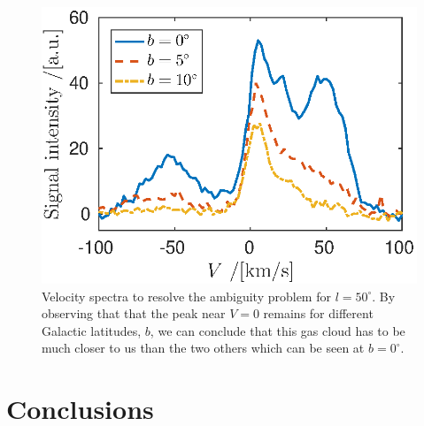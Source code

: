 \documentclass[11pt,a4paper, twocolumn,
swedish, english %
]{article}
\begin{document}
\begin{figure}\centering
\includegraphics[width=1\linewidth]{ambiguity.eps}
\caption{Velocity spectra to resolve the ambiguity problem for
  $l=50^\circ$. By observing that that the peak near $V=0$ remains for
  different Galactic latitudes, $b$, we can conclude that this gas
  cloud has to be much closer to us than the two others which can be
  seen at $b=0^\circ$. }
\label{fig:ambiguity}
\end{figure}



\section{Conclusions}











%


\end{document}
